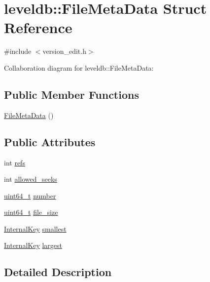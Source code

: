 \hypertarget{structleveldb_1_1_file_meta_data}{}\section{leveldb\+:\+:File\+Meta\+Data Struct Reference}
\label{structleveldb_1_1_file_meta_data}


{\ttfamily \#include $<$version\+\_\+edit.\+h$>$}



Collaboration diagram for leveldb\+:\+:File\+Meta\+Data\+:
\subsection*{Public Member Functions}
\begin{DoxyCompactItemize}
\item 
\hyperlink{structleveldb_1_1_file_meta_data_ab809d499cd560df58cc5c529bb69980a}{File\+Meta\+Data} ()
\end{DoxyCompactItemize}
\subsection*{Public Attributes}
\begin{DoxyCompactItemize}
\item 
int \hyperlink{structleveldb_1_1_file_meta_data_a199e4ba2167c8facad8bd41269982935}{refs}
\item 
int \hyperlink{structleveldb_1_1_file_meta_data_a63f9a0149290c7b22bbc871da6b4f619}{allowed\+\_\+seeks}
\item 
\hyperlink{stdint_8h_aaa5d1cd013383c889537491c3cfd9aad}{uint64\+\_\+t} \hyperlink{structleveldb_1_1_file_meta_data_adc63bac3e06fd4387ebb9f085fc88fe7}{number}
\item 
\hyperlink{stdint_8h_aaa5d1cd013383c889537491c3cfd9aad}{uint64\+\_\+t} \hyperlink{structleveldb_1_1_file_meta_data_a778ea9c773ad4fdfe4408eecaae754f7}{file\+\_\+size}
\item 
\hyperlink{classleveldb_1_1_internal_key}{Internal\+Key} \hyperlink{structleveldb_1_1_file_meta_data_a9e5e5c149495aede836ac637cd89269f}{smallest}
\item 
\hyperlink{classleveldb_1_1_internal_key}{Internal\+Key} \hyperlink{structleveldb_1_1_file_meta_data_a410718ba1868392b298d05a774dd07d1}{largest}
\end{DoxyCompactItemize}


\subsection{Detailed Description}


